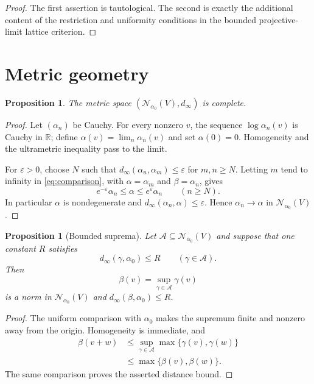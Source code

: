 \documentclass[12pt]{article}
\newtheorem{proposition}[theorem]{Proposition}
\theoremstyle{definition}
\theoremstyle{remark}
\newcommand{\R}{\mathbb R}
\newcommand{\Norm}{\mathscr N}
\newcommand{\dinf}{d_{\infty}}
\begin{document}
\begin{proof}
The first assertion is tautological.  The second is exactly the additional
content of the restriction and uniformity conditions in the bounded
projective-limit lattice criterion.
\end{proof}


\section{Metric geometry}\label{sec:metric}

\begin{proposition}\label{prop:complete}
The metric space $(\Norm_{\alpha_0}(V),\dinf)$ is complete.
\end{proposition}

\begin{proof}
Let $(\alpha_n)$ be Cauchy.  For every nonzero $v$, the sequence
$\log\alpha_n(v)$ is Cauchy in $\R$; define
$\alpha(v)=\lim_n\alpha_n(v)$ and set $\alpha(0)=0$.  Homogeneity and
the ultrametric inequality pass to the limit.

For $\varepsilon>0$, choose $N$ such that
$\dinf(\alpha_n,\alpha_m)\leq\varepsilon$ for $m,n\geq N$.  Letting
$m$ tend to infinity in \eqref{eq:comparison}, with $\alpha = \alpha_m$ and $\beta = \alpha_n$, gives
\[
  e^{-\varepsilon}\alpha_n\leq\alpha\leq
  e^{\varepsilon}\alpha_n \qquad(n\geq N).
\]
In particular $\alpha$ is nondegenerate and
$\dinf(\alpha_n,\alpha)\leq\varepsilon$.  Hence $\alpha_n\to\alpha$ in
$\Norm_{\alpha_0}(V)$.
\end{proof}

\begin{proposition}[Bounded suprema]\label{prop:supremum}
Let $\mathcal A\subseteq\Norm_{\alpha_0}(V)$ and suppose that one
constant $R$ satisfies
\[
  \dinf(\gamma,\alpha_0)\leq R
  \qquad(\gamma\in\mathcal A).
\]
Then
\[
  \beta(v)=\sup_{\gamma\in\mathcal A}\gamma(v)
\]
is a norm in $\Norm_{\alpha_0}(V)$ and
$\dinf(\beta,\alpha_0)\leq R$.
\end{proposition}

\begin{proof}
The uniform comparison with $\alpha_0$ makes the supremum finite and
nonzero away from the origin.  Homogeneity is immediate, and
\begin{align*}
 \beta(v+w)
 &\leq\sup_{\gamma\in\mathcal A}
       \max\{\gamma(v),\gamma(w)\}\\
 &\leq\max\{\beta(v),\beta(w)\}.
\end{align*}
The same comparison proves the asserted distance bound.
\end{proof}
\end{document}
